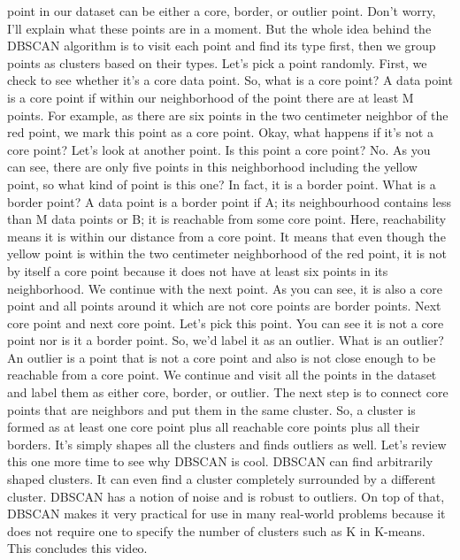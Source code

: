 point in our dataset can be either a core, border, or outlier point. Don't worry, I'll explain what these points are in a moment. But the whole idea behind the DBSCAN algorithm is to visit each point and find its type first, then we group points as clusters based on their types. Let's pick a point randomly. First, we check to see whether it's a core data point. So, what is a core point? A data point is a core point if within our neighborhood of the point there are at least M points. For example, as there are six points in the two centimeter neighbor of the red point, we mark this point as a core point. Okay, what happens if it's not a core point? Let's look at another point. Is this point a core point? No. As you can see, there are only five points in this neighborhood including the yellow point, so what kind of point is this one? In fact, it is a border point. What is a border point? A data point is a border point if A; its neighbourhood contains less than M data points or B; it is reachable from some core point. Here, reachability means it is within our distance from a core point. It means that even though the yellow point is within the two centimeter neighborhood of the red point, it is not by itself a core point because it does not have at least six points in its neighborhood. We continue with the next point. As you can see, it is also a core point and all points around it which are not core points are border points. Next core point and next core point. Let's pick this point. You can see it is not a core point nor is it a border point. So, we'd label it as an outlier. What is an outlier? An outlier is a point that is not a core point and also is not close enough to be reachable from a core point. We continue and visit all the points in the dataset and label them as either core, border, or outlier. The next step is to connect core points that are neighbors and put them in the same cluster. So, a cluster is formed as at least one core point plus all reachable core points plus all their borders. It's simply shapes all the clusters and finds outliers as well. Let's review this one more time to see why DBSCAN is cool. DBSCAN can find arbitrarily shaped clusters. It can even find a cluster completely surrounded by a different cluster. DBSCAN has a notion of noise and is robust to outliers. On top of that, DBSCAN makes it very practical for use in many real-world problems because it does not require one to specify the number of clusters such as K in K-means. This concludes this video. 

